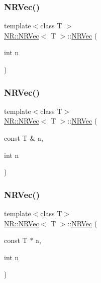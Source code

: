 \mbox{\label{classNR_1_1NRVec_a32e1c3a7b161ae48f90e95f44261c385}} 
\subsubsection{\texorpdfstring{NRVec()}{NRVec()}\hspace{0.1cm}{\footnotesize\ttfamily [2/10]}}
{\footnotesize\ttfamily template$<$class T $>$ \\
\mbox{\hyperlink{classNR_1_1NRVec}{N\+R\+::\+N\+R\+Vec}}$<$ T $>$\+::\mbox{\hyperlink{classNR_1_1NRVec}{N\+R\+Vec}} (\begin{DoxyParamCaption}\item[{int}]{n }\end{DoxyParamCaption})\hspace{0.3cm}{\ttfamily [explicit]}}

\mbox{\label{classNR_1_1NRVec_a876abf88c99fa23c45098f2f48369ec9}} 
\subsubsection{\texorpdfstring{NRVec()}{NRVec()}\hspace{0.1cm}{\footnotesize\ttfamily [3/10]}}
{\footnotesize\ttfamily template$<$class T$>$ \\
\mbox{\hyperlink{classNR_1_1NRVec}{N\+R\+::\+N\+R\+Vec}}$<$ T $>$\+::\mbox{\hyperlink{classNR_1_1NRVec}{N\+R\+Vec}} (\begin{DoxyParamCaption}\item[{const T \&}]{a,  }\item[{int}]{n }\end{DoxyParamCaption})}

\mbox{\label{classNR_1_1NRVec_a20980fe6d9976332123225c883fbe67d}} 
\subsubsection{\texorpdfstring{NRVec()}{NRVec()}\hspace{0.1cm}{\footnotesize\ttfamily [4/10]}}
{\footnotesize\ttfamily template$<$class T$>$ \\
\mbox{\hyperlink{classNR_1_1NRVec}{N\+R\+::\+N\+R\+Vec}}$<$ T $>$\+::\mbox{\hyperlink{classNR_1_1NRVec}{N\+R\+Vec}} (\begin{DoxyParamCaption}\item[{const T $\ast$}]{a,  }\item[{int}]{n }\end{DoxyParamCaption})}

